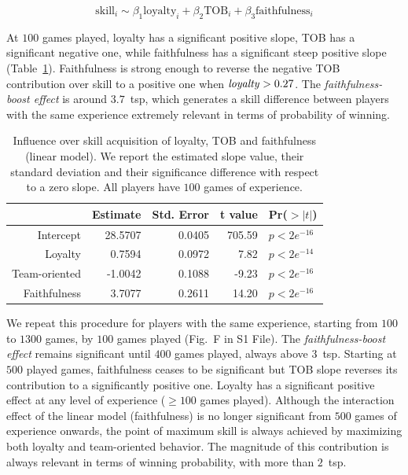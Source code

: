 \documentclass[a4paper,10pt]{book}
\theoremstyle{definition}
\begin{document}
\begin{equation}
\text{skill}_i \sim \beta_1\text{loyalty}_i + \beta_2\text{TOB}_i + \beta_3\text{faithfulness}_i
\end{equation}

At $100$ games played, loyalty has a significant positive slope, TOB has a significant negative one, while faithfulness has a significant steep positive slope (Table~\ref{model}).
Faithfulness is strong enough to reverse the negative TOB contribution over skill to a positive one when $\text{\emph{loyalty}}>0.27$.
The \emph{faithfulness-boost effect} is around $3.7$~tsp, which generates a skill difference between players with the same experience extremely relevant in terms of probability of winning.


\begin{table}[ht]
\centering
\begin{tabular}{rrrrl}
  \hline
 & Estimate & Std. Error & t value & Pr($>|t|$) \\ 
  \hline
Intercept & 28.5707 & 0.0405 & 705.59 & $p< 2e^{-16}$ \\ 
  Loyalty & 0.7594 & 0.0972 & 7.82 & $p< 2e^{-14}$ \\ 
  Team-oriented & -1.0042 & 0.1088 & -9.23 & $p< 2e^{-16}$ \\ 
  Faithfulness & 3.7077 & 0.2611 & 14.20 & $p< 2e^{-16}$ \\ 
   \hline
\end{tabular}
\caption{Influence over skill acquisition of loyalty, TOB and faithfulness (linear model). We report the estimated slope value, their standard deviation and their significance difference with respect to a zero slope. All players have $100$ games of experience.}
\label{model}
\end{table}

We repeat this procedure for players with the same experience, starting from $100$ to $1300$ games, by $100$ games played (Fig.~F in S1 File).
The \emph{faithfulness-boost effect} remains significant until $400$ games played, always above $3$~tsp.
Starting at $500$ played games, faithfulness ceases to be significant but TOB slope reverses its contribution to a significantly positive one.
Loyalty has a significant positive effect at any level of experience ($\geq 100$ games played).
Although the interaction effect of the linear model (faithfulness) is no longer significant from $500$ games of experience onwards, the point of maximum skill is always achieved by maximizing both loyalty and team-oriented behavior.
The magnitude of this contribution is always relevant in terms of winning probability, with more than $2$~tsp.
\end{document}
